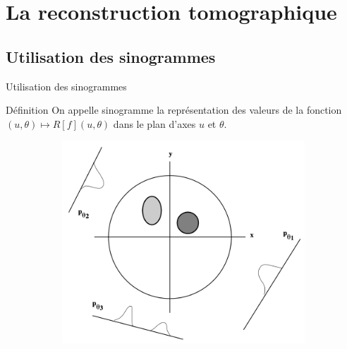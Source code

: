 \documentclass{beamer}
\begin{document}
\section{La reconstruction tomographique}
\subsection{Utilisation des sinogrammes}

\begin{frame}{Utilisation des sinogrammes}
    \begin{beamerboxesrounded}{Définition}
        On appelle sinogramme la représentation des valeurs de la fonction \\$(u,\theta) \mapsto R[f](u,\theta)$ dans le plan d'axes $u$ et $\theta$. 
    \end{beamerboxesrounded}
    \begin{figure}[t]
        \centering
        \begin{subfigure}[b]{0.42\textwidth}
            \includegraphics[width=\textwidth]{projectionStep3.png}
        \end{subfigure}
        \qquad \qquad 
        \begin{subfigure}[b]{0.42\textwidth}

\end{subfigure}
\end{figure}
\end{frame}
\end{document}
